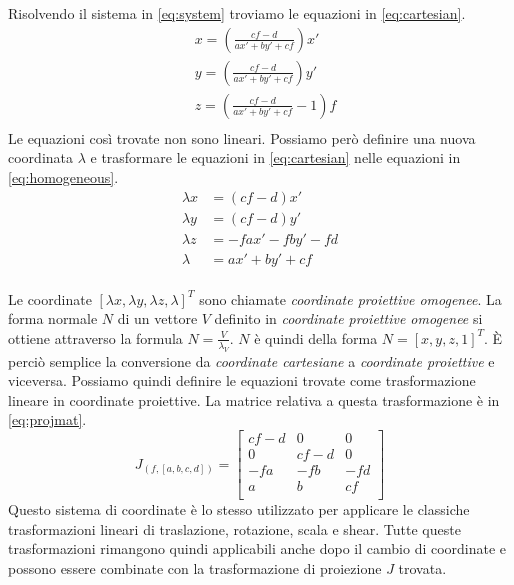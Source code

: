 Risolvendo il sistema in \ref{eq:system} troviamo le equazioni in \ref{eq:cartesian}.
\begin{equation}
    \label{eq:cartesian}
    \begin{aligned}
         & x = \left( \frac{cf - d}{ax' + by' + cf} \right) x'    \\
         & y = \left( \frac{cf - d}{ax' + by' + cf} \right) y'    \\
         & z = \left( \frac{cf - d}{ax' + by' + cf} - 1 \right) f \\
    \end{aligned}
\end{equation}
Le equazioni così trovate non sono lineari.
Possiamo però definire una nuova coordinata $\lambda$ e trasformare le equazioni in \ref{eq:cartesian} nelle equazioni in \ref{eq:homogeneous}.
\begin{equation}
    \label{eq:homogeneous}
    \begin{aligned}
        \lambda x & = (cf - d) x'       \\
        \lambda y & = (cf - d) y'       \\
        \lambda z & = -fax' - fby' - fd \\
        \lambda   & = ax' + by' + cf    \\
    \end{aligned}
\end{equation}

Le coordinate $[\lambda x, \lambda y, \lambda z, \lambda]^T$ sono chiamate \emph{coordinate proiettive omogenee}.
La forma normale $N$ di un vettore $V$ definito in \emph{coordinate proiettive omogenee} si ottiene attraverso la formula $N = \displaystyle\frac{V}{\lambda_V}$.
$N$ è quindi della forma $N = [x, y, z, 1]^T$.
È perciò semplice la conversione da \emph{coordinate cartesiane} a \emph{coordinate proiettive} e viceversa.
Possiamo quindi definire le equazioni trovate come trasformazione lineare in coordinate proiettive.
La matrice relativa a questa trasformazione è in \ref{eq:projmat}.
\begin{equation}
    \label{eq:projmat}
    J_{(f, [a, b, c, d])} =
    \begin{bmatrix}
        cf - d & 0      & 0   \\
        0      & cf - d & 0   \\
        -fa    & -fb    & -fd \\
        a      & b      & cf  \\
    \end{bmatrix}
\end{equation}
Questo sistema di coordinate è lo stesso utilizzato per applicare le classiche trasformazioni lineari di traslazione, rotazione, scala e shear.
Tutte queste trasformazioni rimangono quindi applicabili anche dopo il cambio di coordinate e possono essere combinate con la trasformazione di proiezione $J$ trovata.

